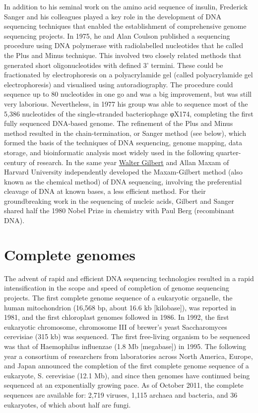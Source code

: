 In addition to his seminal work on the amino acid sequence of insulin, Frederick Sanger and his colleagues played a key role in the development of DNA sequencing techniques that enabled the establishment of comprehensive genome sequencing projects. In 1975, he and Alan Coulson published a sequencing procedure using DNA polymerase with radiolabelled nucleotides that he called the Plus and Minus technique. This involved two closely related methods that generated short oligonucleotides with defined 3' termini. These could be fractionated by electrophoresis on a polyacrylamide gel (called polyacrylamide gel electrophoresis) and visualised using autoradiography. The procedure could sequence up to 80 nucleotides in one go and was a big improvement, but was still very laborious. Nevertheless, in 1977 his group was able to sequence most of the 5,386 nucleotides of the single-stranded bacteriophage φX174, completing the first fully sequenced DNA-based genome. The refinement of the Plus and Minus method resulted in the chain-termination, or Sanger method (see below), which formed the basis of the techniques of DNA sequencing, genome mapping, data storage, and bioinformatic analysis most widely used in the following quarter-century of research. In the same year \href{https://en.wikipedia.org/wiki/Walter_Gilbert}{Walter Gilbert} and Allan Maxam of Harvard University independently developed the Maxam-Gilbert method (also known as the chemical method) of DNA sequencing, involving the preferential cleavage of DNA at known bases, a less efficient method. For their groundbreaking work in the sequencing of nucleic acids, Gilbert and Sanger shared half the 1980 Nobel Prize in chemistry with Paul Berg (recombinant DNA).

\hypertarget{complete-genomes}{%
\section{Complete genomes}\label{complete-genomes}}

The advent of rapid and efficient DNA sequencing technologies resulted in a rapid intensification in the scope and speed of completion of genome sequencing projects. The first complete genome sequence of a eukaryotic organelle, the human mitochondrion (16,568 bp, about 16.6 kb {[}kilobase{]}), was reported in 1981, and the first chloroplast genomes followed in 1986. In 1992, the first eukaryotic chromosome, chromosome III of brewer's yeast Saccharomyces cerevisiae (315 kb) was sequenced. The first free-living organism to be sequenced was that of Haemophilus influenzae (1.8 Mb {[}megabase{]}) in 1995. The following year a consortium of researchers from laboratories across North America, Europe, and Japan announced the completion of the first complete genome sequence of a eukaryote, S. cerevisiae (12.1 Mb), and since then genomes have continued being sequenced at an exponentially growing pace. As of October 2011, the complete sequences are available for: 2,719 viruses, 1,115 archaea and bacteria, and 36 eukaryotes, of which about half are fungi.

